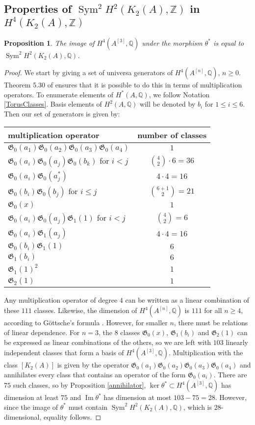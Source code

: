 \documentclass{alggeom}
\DeclareMathOperator{\im}{Im}
\DeclareMathOperator{\Sym}{Sym}
\newcommand{\hilb}[1]{^{[#1]}}
\newcommand{\G}{\mathfrak{G}}
\newcommand{\kum}[2]{K_{ #2 }( #1 )}
\newcommand{\X}{\kum{A}{2}}
\newcommand{\Q}{\mathbb{Q}}
\newcommand{\Z}{\mathbb{Z}}
\theoremstyle{plain}
\newtheorem{proposition}[theorem]{Proposition}
\theoremstyle{definition}
\theoremstyle{remark}
\begin{document}
\subsection{Properties of $\Sym^2H^2(K_2(A),\Z)$ in $H^4(K_2(A),\Z)$}\label{SyminH4}
\begin{proposition}\label{ImSym}
The image of $H^4(A\hilb{3},\Q)$ under the morphism $\theta^*$ is equal to $\Sym^2H^2(\X,\Q)$.
\end{proposition}
\begin{proof}
We start by giving a set of universa generators of $H^4(A\hilb{n},\Q)$, $n\geq 0$. Theorem 5.30 of \cite{LiQinWang} ensures that it is possible to do this in terms of multiplication operators. To enumerate elements of $H^*(A,\Q)$, we follow Notation \ref{TorusClasses}. Basis elements of $H^2(A,\Q)$ will be denoted by $b_i$ for $1\leq i\leq 6$. Then our set of generators is given by:
\begin{center}
\begin{tabular}{l|c}
multiplication operator & number of classes \\ \hline
$\G_0(a_1)\G_0(a_2)\G_0(a_3)\G_0(a_4) $  & $1$ \\
$\G_0(a_i)\G_0(a_j)\G_0(b_k)$ for $i<j$  & $\binom{4}{2}\cdot 6 = 36$ \\
$\G_0(a_i)\G_0(a_j^*)$ & $4\cdot 4 = 16$ \\
$\G_0(b_i)\G_0(b_j)$ for $i\leq j$& $\binom{6+1}{2}= 21$ \\
$\G_0(x)$ &  $1$  \\ \hline
$\G_0(a_i)\G_0(a_j)\G_1(1)$ for $i<j$ & $\binom{4}{2} = 6$ \\
$\G_0(a_i)\G_1(a_j)$ & $4\cdot 4=16$ \\
$\G_0(b_i)\G_1(1)$ & $6$ \\
$\G_1(b_i)$ & $6$ \\
$\G_1(1)^2 $ & $1$ \\ \hline
$\G_2(1) $ &$1$
\end{tabular}
\end{center}
Any multiplication operator of degree $4$ can be written as a linear combination of these $111$ classes. Likewise, the dimension of $H^4(A\hilb{n},\Q)$ is $111$ for all $n\geq 4$, according to G\"ottsche's formula \cite[p.~35]{Gottsche}. However, for smaller $n$, there must be relations of linear dependence. For $n=3$, the $8$ classes $\G_0(x)$, $\G_1(b_i)$ and $\G_2(1) $ can be expressed as linear combinations of the others, so we are left with $103$ linearly independent classes that form a basis of $H^4(A\hilb{3},\Q)$. Multiplication with the class $[\X]$ is given by the operator $\G_0(a_1)\G_0(a_2)\G_0(a_3)\G_0(a_4) $ and annihilates every class that contains an operator of the form $\G_0(a_i)$. There are $75$ such classes, so by Proposition \ref{annihilator}, $\ker \theta^*\subset H^4(A\hilb{3},\Q)$ has dimension at least $75$ and $\im\theta^*$ has dimension at most $103-75=28$. However, since the image of $\theta^*$ must contain $\Sym^2H^2(\X,\Q)$, which is $28$-dimensional, equality follows.
\end{proof}
\end{document}
